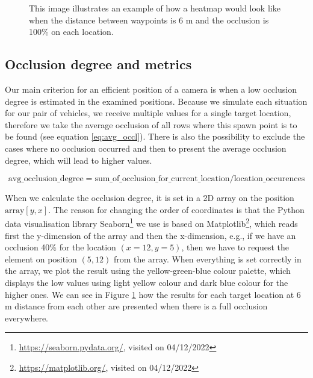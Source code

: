 \begin{figure} [h!]
    \centering
    
    \caption[Heatmap target full occlusion]{This image illustrates an example of how a heatmap would look like when the distance between waypoints is 6 m and the occlusion is 100\% on each location.}
    \label{fig:heatmap_target}
\end{figure}
 
\subsection{Occlusion degree and metrics} \label{subsec:metrics}
Our main criterion for an efficient position of a camera is when a low occlusion degree is estimated in the examined positions. Because we simulate each situation for our pair of vehicles, we receive multiple values for a single target location, therefore we take the average occlusion of all rows where this spawn point is to be found (see equation \ref{eq:avg_occl}). There is also the possibility to exclude the cases where no occlusion occurred and then to present the average occlusion degree, which will lead to higher values. 

\begin{equation}
    \textrm{avg\_occlusion\_degree} = \textrm{sum\_of\_occlusion\_for\_current\_location} / \textrm{location\_occurences}\label{eq:avg_occl}
\end{equation}

When we calculate the occlusion degree, it is set in a 2D array on the position $\textrm{array}[y,x]$. The reason for changing the order of coordinates is that the Python data visualisation library Seaborn\footnote{\url{https://seaborn.pydata.org/}, visited on 04/12/2022} we use is based on Matplotlib\footnote{\url{https://matplotlib.org/}, visited on 04/12/2022}, which reads first the y-dimension of the array and then the x-dimension, e.g., if we have an occlusion 40\% for the location $(x=12,y=5)$, then we have to request the element on position $(5,12)$ from the array. When everything is set correctly in the array, we plot the result using the yellow-green-blue colour palette, which displays the low values using light yellow colour and dark blue colour for the higher ones. We can see in Figure \ref{fig:heatmap_target} how the results for each target location at 6 m distance from each other are presented when there is a full occlusion everywhere. 

